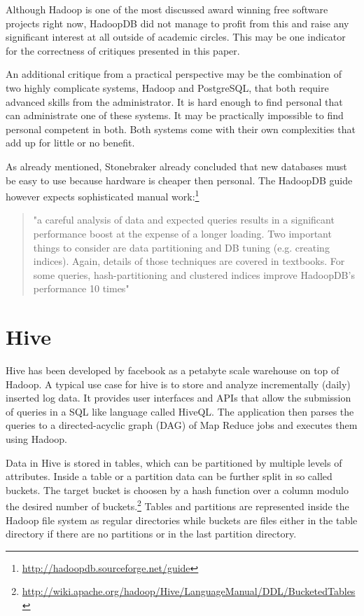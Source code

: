 \documentclass[12pt,a4paper]{scrartcl}		%
\begin{document}
Although Hadoop is one of the most discussed award winning free software projects right now, HadoopDB did not manage to profit from this and raise any significant interest at all outside of academic circles. This may be one indicator for the correctness of critiques presented in this paper.

An additional critique from a practical perspective may be the combination of two highly complicate systems, Hadoop and PostgreSQL, that both require advanced skills from the administrator. It is hard enough to find personal that can administrate one of these systems. It may be practically impossible to find personal competent in both. Both systems come with their own complexities that add up for little or no benefit.

As already mentioned, Stonebraker already concluded that new databases must be easy to use because hardware is cheaper then personal. The HadoopDB guide however expects sophisticated manual work:\footnote{\url{http://hadoopdb.sourceforge.net/guide}}
\begin{quote}
"a careful analysis of data and expected queries results in a significant performance boost at the expense of a longer loading. Two important things to consider are data partitioning and DB tuning (e.g. creating indices). Again, details of those techniques are covered in textbooks. For some queries, hash-partitioning and clustered indices improve HadoopDB's performance 10 times"  
\end{quote}


\section{Hive}

Hive has been developed by facebook as a petabyte scale warehouse on top of Hadoop.\cite{Thusoo_hive-a} A typical use case for hive is to store and analyze incrementally (daily) inserted log data. It provides user interfaces and APIs that allow the submission of queries in a SQL like language called HiveQL. The application then parses the queries to a directed-acyclic graph (DAG) of Map Reduce jobs and executes them using Hadoop.

Data in Hive is stored in tables, which can be partitioned by multiple levels of attributes. Inside a table or a partition data can be further split in so called buckets. The target bucket is choosen by a hash function over a column modulo the desired number of buckets.\footnote{\url{http://wiki.apache.org/hadoop/Hive/LanguageManual/DDL/BucketedTables}} Tables and partitions are represented inside the Hadoop file system as regular directories while buckets are files either in the table directory if there are no partitions or in the last partition directory.
\end{document}
